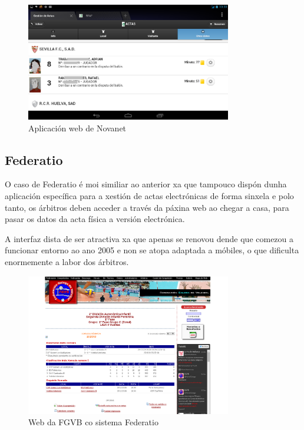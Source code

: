       \begin{figure}[h!]
	\begin{center}
	  \includegraphics[width=0.8\textwidth]{./img/novanet-app.png}
	  \caption{Aplicación web de Novanet}
	\end{center}
      \end{figure}

\clearpage

    \subsection{Federatio}

    O caso de Federatio é moi similiar ao anterior xa que tampouco dispón dunha 
aplicación específica para a xestión de actas electrónicas de forma sinxela e polo tanto, 
os árbitros deben acceder a través da páxina web ao chegar a casa, para pasar os datos da 
acta física a versión electrónica.

    A interfaz dista de ser atractiva xa que apenas se renovou dende que comezou a 
funcionar entorno ao ano 2005 e non se atopa adaptada a móbiles, o que dificulta 
enormemente a labor dos árbitros.


      \begin{figure}[h!]
	\begin{center}
	  \includegraphics[width=0.8\textwidth]{./img/federatio-app.png}
	  \caption{Web da FGVB co sistema Federatio}
	\end{center}
      \end{figure}

